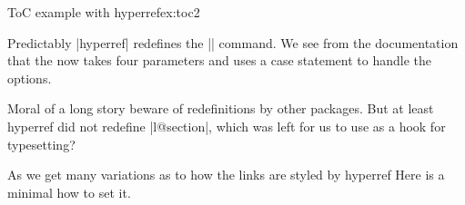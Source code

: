 \begin{texexample}{ToC example with hyperref}{ex:toc2}
%
\end{texexample}

Predictably |hyperref| redefines the |\contentsline| command. We see from the documentation that 
the  now takes four parameters and uses a case statement to handle the options.
\begin{teX}
\def\contentsline#1#2#3#4{%
  \ifx\\#4\\%
    	\csname l@#1\endcsname{#2}{#3}%
  \else
 	\ifcase\Hy@linktoc %
 		\csname l@#1\endcsname{#2}{#3}%
 	\or %
 		\csname l@#1\endcsname{%
  	   \hyper@linkstart{link}{#4}{#2}\hyper@linkend
    	}{#3}%
  	 \or %
		\csname l@#1\endcsname{{#2}}{%
    	\hyper@linkstart{link}{#4}{#3}\hyper@linkend
    	}%
 	\else %
 		\csname l@#1\endcsname{%
 	\hyper@linkstart{link}{#4}{#2}\hyper@linkend
 	}{%
 	\hyper@linkstart{link}{#4}{#3}\hyper@linkend
 	}%
 	\fi
 \fi
}
\end{teX}

%

Moral of a long story beware of redefinitions by other packages. But at least hyperref did not redefine |l@section|,
which was left for us to use as a hook for typesetting? 

As we get many variations as to how the links are styled by hyperref
Here is a minimal how to set it.

